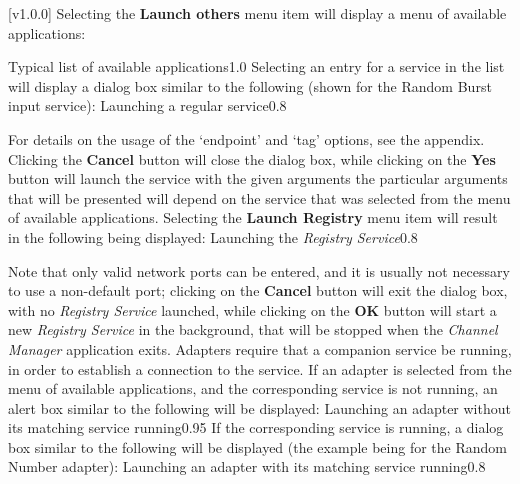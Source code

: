 [v1.0.0]
Selecting the \textbf{Launch others \textellipsis} menu item will display a menu of
available applications:

%
{Typical list of available applications}{1.0}
\condPage{}
Selecting an entry for a service in the list will display a dialog box similar to the
following (shown for the Random Burst input service):
%
{Launching a regular service}{0.8}

For details on the usage of the `endpoint' and `tag' options, see the 
 appendix.
Clicking the \textbf{Cancel} button will close the dialog box, while clicking on the
\textbf{Yes} button will launch the service with the given arguments \longDash{} the
particular arguments that will be presented will depend on the service that was selected
from the menu of available applications.
\secondaryEnd
\condPage
{}
Selecting the \textbf{Launch Registry} menu item will result in the following being
displayed:
%
{Launching the \emph{Registry Service}}{0.8}

Note that only valid network ports can be entered, and it is usually not necessary to use
a non-default port; clicking on the \textbf{Cancel} button will exit the dialog box, with
no \emph{Registry Service} launched, while clicking on the \textbf{OK} button will start a
new \emph{Registry Service} in the background, that will be stopped when the
\emph{Channel Manager} application exits.
\secondaryEnd
{}
Adapters require that a companion service be running, in order to establish a connection
to the service.
If an adapter is selected from the menu of available applications, and the corresponding
service is not running, an alert box similar to the following will be displayed:
%
{Launching an adapter without its matching service running}{0.95}
\condPage{}
If the corresponding service is running, a dialog box similar to the following will be
displayed (the example being for the Random Number adapter):
%
{Launching an adapter with its matching service running}{0.8}

